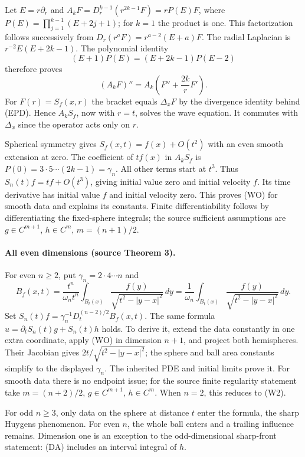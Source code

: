 \begin{expandedproof}
Let $E=r\partial_r$ and
$A_kF=D_r^{k-1}(r^{2k-1}F)=rP(E)F$,
where $P(E)=\prod_{j=1}^{k-1}(E+2j+1)$; for $k=1$ the product is one.
This factorization follows successively from
$D_r(r^aF)=r^{a-2}(E+a)F$.
The radial Laplacian is $r^{-2}E(E+2k-1)$.
The polynomial identity
\[
 (E+1)P(E)=(E+2k-1)P(E-2)
\]
therefore proves
\[
 (A_kF)''=A_k\left(F''+\frac{2k}{r}F'\right).
\]
For $F(r)=S_f(x,r)$ the bracket equals $\Delta_xF$ by the divergence
identity behind (EPD). Hence $A_kS_f$, now with $r=t$, solves the wave
equation. It commutes with $\Delta_x$ since the operator acts only on $r$.

Spherical symmetry gives $S_f(x,t)=f(x)+O(t^2)$ with an even smooth
extension at zero. The coefficient of $t f(x)$ in
$A_kS_f$ is $P(0)=3\cdot5\cdots(2k-1)=\gamma_n$.
All other terms start at $t^3$.
Thus $S_n(t)f=t f+O(t^3)$, giving initial value zero and initial
velocity $f$. Its time derivative has initial value $f$ and initial
velocity zero. This proves (WO) for smooth data and explains its constants.
Finite differentiability follows by differentiating the fixed-sphere
integrals; the source sufficient assumptions are
$g\in C^{m+1}$, $h\in C^m$, $m=(n+1)/2$.
\end{expandedproof}

\paragraph{All even dimensions (source Theorem 3).}
For even $n\geq2$, put $\gamma_n=2\cdot4\cdots n$ and
\[
 B_f(x,t)=\frac{t^n}{\omega_nt^n}
          \int_{B_t(x)}\frac{f(y)}{\sqrt{t^2-|y-x|^2}}\,dy
 =\frac1{\omega_n}\int_{B_t(x)}
          \frac{f(y)}{\sqrt{t^2-|y-x|^2}}\,dy .
\]
Set $S_n(t)f=\gamma_n^{-1}D_t^{(n-2)/2}B_f(x,t)$.
The same formula $u=\partial_tS_n(t)g+S_n(t)h$ holds.
To derive it, extend the data constantly in one extra coordinate,
apply (WO) in dimension $n+1$, and project both hemispheres.
Their Jacobian gives $2t/\sqrt{t^2-|y-x|^2}$; the sphere and ball
area constants simplify to the displayed $\gamma_n$.
The inherited PDE and initial limits prove it.
For smooth data there is no endpoint issue; for the source finite
regularity statement take $m=(n+2)/2$, $g\in C^{m+1}$, $h\in C^m$.
When $n=2$, this reduces to (W2).

For odd $n\geq3$, only data on the sphere at distance $t$ enter the
formula, the sharp Huygens phenomenon.
For even $n$, the whole ball enters and a trailing influence remains.
Dimension one is an exception to the odd-dimensional sharp-front
statement: (DA) includes an interval integral of $h$.

